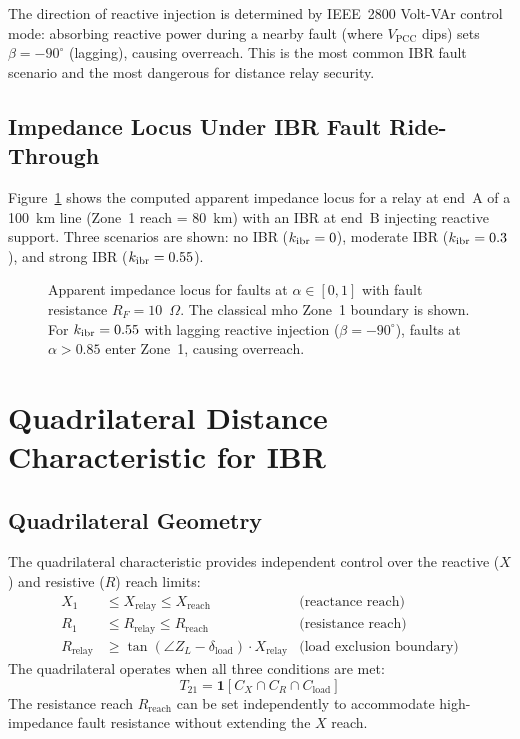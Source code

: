 The direction of reactive injection is determined by IEEE~2800 Volt-VAr
control mode: absorbing reactive power during a nearby fault (where
$V_\mathrm{PCC}$ dips) sets $\beta = -90^\circ{}$ (lagging), causing overreach.
This is the most common IBR fault scenario and the most dangerous for
distance relay security.

\subsection{Impedance Locus Under IBR Fault Ride-Through}

Figure~\ref{fig:ch5_impedance_locus} shows the computed apparent impedance
locus for a relay at end~A of a 100~km line (Zone~1 reach = 80~km) with
an IBR at end~B injecting reactive support. Three scenarios are shown:
no IBR ($k_\mathrm{ibr} = 0$), moderate IBR ($k_\mathrm{ibr} = 0.3$), and strong IBR
($k_\mathrm{ibr} = 0.55$).

\begin{figure}[htbp]
  \centering
  
  \caption{Apparent impedance locus for faults at $\alpha \in [0, 1]$
           with fault resistance $R_F = 10$~$\Omega$. The classical mho
           Zone~1 boundary is shown. For $k_\mathrm{ibr} = 0.55$ with lagging
           reactive injection ($\beta = -90^\circ{}$), faults at $\alpha > 0.85$
           enter Zone~1, causing overreach.}
  \label{fig:ch5_impedance_locus}
\end{figure}

\section{Quadrilateral Distance Characteristic for IBR}
\label{sec:ch7_quadrilateral}

\subsection{Quadrilateral Geometry}

The quadrilateral characteristic provides independent control over
the reactive ($X$) and resistive ($R$) reach limits:
\begin{align}
  X_1 &\leq X_\mathrm{relay} \leq X_\mathrm{reach} & \text{(reactance reach)}
  \label{eq:ch5_quad_x} \\
  R_1 &\leq R_\mathrm{relay} \leq R_\mathrm{reach} & \text{(resistance reach)}
  \label{eq:ch5_quad_r} \\
  R_\mathrm{relay} &\geq \tan(\angle Z_L - \delta_\mathrm{load}) \cdot X_\mathrm{relay}
    & \text{(load exclusion boundary)}
  \label{eq:ch5_quad_load}
\end{align}
The quadrilateral operates when all three conditions are met:
\begin{equation}
  T_{21} = \mathbf{1}[C_X \cap C_R \cap C_\mathrm{load}]
  \label{eq:ch5_quad_trip}
\end{equation}
The resistance reach $R_\mathrm{reach}$ can be set independently to
accommodate high-impedance fault resistance without extending the $X$ reach.


